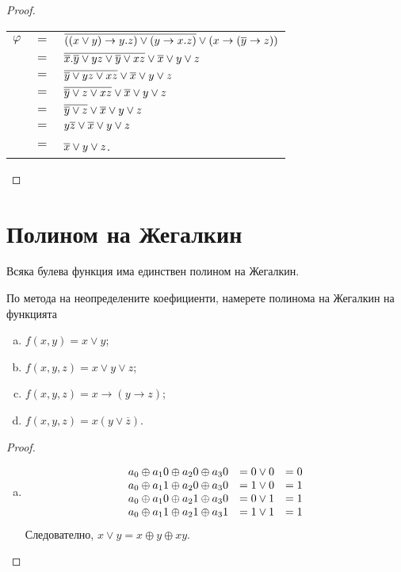 \begin{proof}
\begin{itemize}
    \begin{tabular}{l c l}
      $\varphi $ & $ = $ & $\overline{((x\vee y) \rightarrow y.z)\vee (y\rightarrow x.z)} \vee (x\rightarrow (\overline{y}\rightarrow z)) $\\
      & $=$ & $\overline{\overline{x}.\overline{y}\vee yz \vee \overline{y}\vee xz} \vee \overline{x}\vee y \vee z$\\
      & $=$& $\overline{\overline{y}\vee yz \vee xz} \vee \overline{x}\vee y \vee z$ \\
      & $=$ & $\overline{\overline{y}\vee z \vee xz} \vee \overline{x}\vee y \vee z$\\
      & $=$ & $\overline{\overline{y}\vee z} \vee \overline{x}\vee y \vee z$ \\
      & $=$ & $y\overline{z} \vee \overline{x}\vee y \vee z$ \\
      & $=$ & $\overline{x}\vee y \vee z$.
    \end{tabular}
\end{itemize}
\end{proof}

\section{Полином на Жегалкин}

\begin{thm}
  Всяка булева функция има единствен полином на Жегалкин.
\end{thm}


\begin{problem}
  По метода на неопределените коефициенти, намерете полинома на Жегалкин на функцията 
  \begin{enumerate}[a)]
  \item
    $f(x,y) = x\vee y$;
  \item
    $f(x,y,z) = x\vee y \vee z$;
  \item
    $f(x,y,z) = x\rightarrow (y \rightarrow z)$;
  \item
    $f(x,y,z) = x(y\vee\overline{z})$.
  \end{enumerate}
\end{problem}
\begin{proof}
  \begin{enumerate}[a)]
  \item
    \[
    \begin{array}{c c c}
      a_0\oplus a_1 0 \oplus a_2 0 \oplus a_3 0 & = 0 \vee 0  &  = 0\\
      a_0\oplus a_1 1 \oplus a_2 0 \oplus a_3 0 & = 1 \vee 0  &  = 1\\
      a_0\oplus a_1 0 \oplus a_2 1 \oplus a_3 0 & = 0 \vee 1  &  = 1\\
      a_0\oplus a_1 1 \oplus a_2 1 \oplus a_3 1 & = 1 \vee 1  &  = 1\\
    \end{array}
    \]
    Следователно, $x\vee y = x\oplus y\oplus xy$.
  \end{enumerate}
\end{proof}

